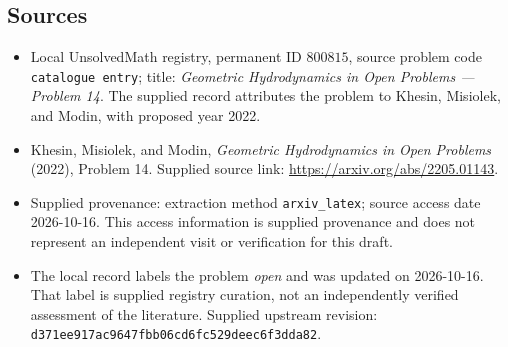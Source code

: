 \documentclass[11pt]{article}
\begin{document}
\subsection{Sources}
\begin{itemize}
\item Local UnsolvedMath registry, permanent ID \(800815\), source problem code \texttt{catalogue entry}; title: \emph{Geometric Hydrodynamics in Open Problems --- Problem 14}. The supplied record attributes the problem to Khesin, Misiolek, and Modin, with proposed year 2022.
\item Khesin, Misiolek, and Modin, \emph{Geometric Hydrodynamics in Open Problems} (2022), Problem 14. Supplied source link: \url{https://arxiv.org/abs/2205.01143}.
\item Supplied provenance: extraction method \texttt{arxiv\_latex}; source access date 2026-10-16. This access information is supplied provenance and does not represent an independent visit or verification for this draft.
\item The local record labels the problem \emph{open} and was updated on 2026-10-16. That label is supplied registry curation, not an independently verified assessment of the literature. Supplied upstream revision: \texttt{d371ee917ac9647fbb06cd6fc529deec6f3dda82}.
\end{itemize}
\end{document}
